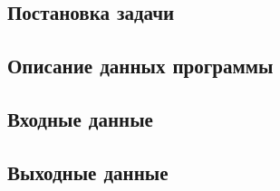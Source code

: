 \subsection{Постановка задачи}


\subsection{Описание данных программы}


\subsection{Входные данные}


\subsection{Выходные данные}
